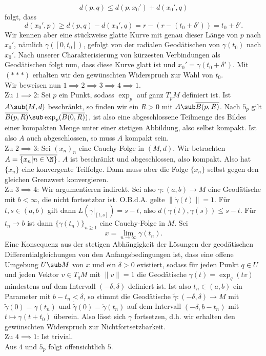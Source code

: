 \begin{beweis}
\begin{equation}
d(p,q) \leq d(p, x_0') + d(x_0', q)
\end{equation}
folgt, dass
\begin{equation}
d(x_0', p) \geq d(p,q)-d(x_0',q) = r-(r-(t_0+\delta')) = t_0 + \delta'.
\end{equation}
Wir kennen aber eine stückweise glatte Kurve mit genau dieser Länge von $p$ nach $x_0'$, nämlich $\gamma([0,t_0])$, gefolgt von der radialen Geodätischen von $\gamma(t_0)$ nach $x_0'$. Nach unserer Charakterisierung von kürzesten Verbindungen als Geodätischen folgt nun, dass diese Kurve glatt ist und $x_0' = \gamma(t_0+\delta')$. Mit $(\ast \ast \ast)$ erhalten wir den gewünschten Widerspruch zur Wahl von $t_0$.\\
Wir beweisen nun $1 \implies 2 \implies 3 \implies 4 \implies 1$.\\
Zu $1 \implies 2$: Sei $p$ ein Punkt, sodass $\exp_p$ auf ganz $T_pM$ definiert ist. Ist $A \sub (M,d)$ beschränkt, so finden wir ein $R > 0$ mit $A \sub \overline{B(p,R)}$. Nach $5_p$ gilt $\overline{B(p,R)} \sub \exp_p(\overline{B(0,R)})$, ist also eine abgeschlossene Teilmenge des Bildes einer kompakten Menge unter einer stetigen Abbildung, also selbst kompakt. Ist also $A$ auch abgeschlossen, so muss $A$ kompakt sein.\\
Zu $2 \implies 3$: Sei $(x_n)_n$ eine Cauchy-Folge in $(M,d)$. Wir betrachten $A = \overline{\{ x_n | n \in \N \}}$. $A$ ist beschränkt und abgeschlossen, also kompakt. Also hat $\{x_n\}$ eine konvergente Teilfolge. Dann muss aber die Folge $\{x_n\}$ selbst gegen den gleichen Grenzwert konvergieren.\\
Zu $3 \implies 4$: Wir argumentieren indirekt. Sei also $\gamma: (a,b) \to M$ eine Geodätische mit $b < \infty$, die nicht fortsetzbar ist. O.B.d.A. gelte $\| \dot{\gamma}(t) \| = 1$. Für $t,s \in (a,b)$ gilt dann $L(\gamma|_{[t,s]}) = s-t$, also $d(\gamma(t), \gamma(s)) \leq s-t$. Für $t_n \to b$ ist dann $\{\gamma(t_n)\}_{n \geq 1}$ eine Cauchy-Folge in $M$. Sei 
\begin{equation}
x = \lim_{n \to \infty} \gamma(t_n).
\end{equation}
Eine Konsequenz aus der stetigen Abhängigkeit der Lösungen der geodätischen Differentialgleichungen von den Anfangsbedingungen ist, dass eine offene Umgebung $U \sub M$ von $x$ und ein $\delta > 0$ existiert, sodass für jeden Punkt $q \in U$ und jeden Vektor $v \in T_qM$ mit $\|v\| = 1$ die Geodätische $\gamma(t) = \exp_q(tv)$ mindestens auf dem Intervall $(-\delta, \delta)$ definiert ist. Ist also $t_n \in (a,b)$ ein Parameter mit $b-t_n < \delta$, so stimmt die Geodätische $\tilde{\gamma}:(-\delta, \delta) \to M$ mit $\tilde{\gamma}(0)=\gamma(t_n)$ und $\dot{\tilde{\gamma}}(0) = \dot{\gamma}(t_n)$ auf dem Intervall $(- \delta, b-t_n)$ mit $t \mapsto \gamma(t+t_0)$ überein. Also lässt sich $\gamma$ fortsetzen, d.h. wir erhalten den gewünschten Widerspruch zur Nichtfortsetzbarkeit.\\
Zu $4 \implies 1$: Ist trivial.\\
Aus $4$ und $5_p$ folgt offensichtlich $5$.
\end{beweis}
